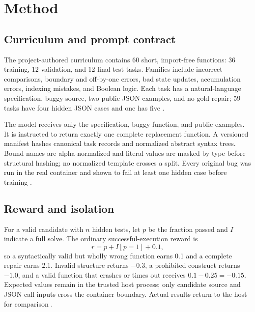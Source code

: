 \documentclass[11pt]{article}
\begin{document}
\section{Method}

\subsection{Curriculum and prompt contract}

The project-authored curriculum contains 60 short, import-free functions: 36 training, 12 validation, and 12 final-test tasks. Families include incorrect comparisons, boundary and off-by-one errors, bad state updates, accumulation errors, indexing mistakes, and Boolean logic. Each task has a natural-language specification, buggy source, two public JSON examples, and no gold repair; 59 tasks have four hidden JSON cases and one has five \cite{runsummary}.

The model receives only the specification, buggy function, and public examples. It is instructed to return exactly one complete replacement function. A versioned manifest hashes canonical task records and normalized abstract syntax trees. Bound names are alpha-normalized and literal values are masked by type before structural hashing; no normalized template crosses a split. Every original bug was run in the real container and shown to fail at least one hidden case before training \cite{sourcecommit,runsummary}.

\subsection{Reward and isolation}

For a valid candidate with $n$ hidden tests, let $p$ be the fraction passed and $I$ indicate a full solve. The ordinary successful-execution reward is
\begin{equation}
  r = p + I[p=1] + 0.1,
\end{equation}
so a syntactically valid but wholly wrong function earns 0.1 and a complete repair earns 2.1. Invalid structure returns $-0.3$, a prohibited construct returns $-1.0$, and a valid function that crashes or times out receives $0.1-0.25=-0.15$. Expected values remain in the trusted host process; only candidate source and JSON call inputs cross the container boundary. Actual results return to the host for comparison \cite{sourcecommit}.
\end{document}
